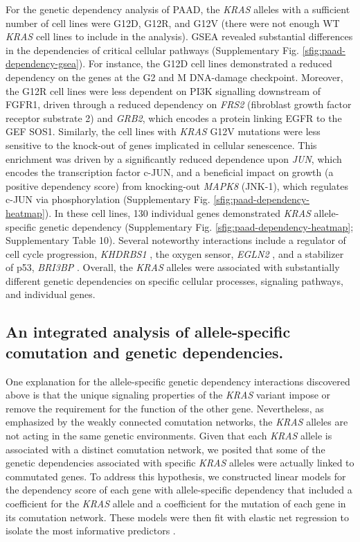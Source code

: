 \documentclass[english, 10pt, letterpaper]{article}
\newcommand{\KRAS}{\emph{KRAS}}
\begin{document}
For the genetic dependency analysis of PAAD, the \KRAS{} alleles with a sufficient number of cell lines were G12D, G12R, and G12V (there were not enough WT \KRAS{} cell lines to include in the analysis).
GSEA revealed substantial differences in the dependencies of critical cellular pathways (Supplementary Fig. \ref{sfig:paad-dependency-gsea}).
For instance, the G12D cell lines demonstrated a reduced dependency on the genes at the G2 and M DNA-damage checkpoint.
Moreover, the G12R cell lines were less dependent on PI3K signalling downstream of FGFR1, driven through a reduced dependency on \emph{FRS2} (fibroblast growth factor receptor substrate 2) and \emph{GRB2}, which encodes a protein linking EGFR to the GEF SOS1.
Similarly, the cell lines with \KRAS{} G12V mutations were less sensitive to the knock-out of genes implicated in cellular senescence.
This enrichment was driven by a significantly reduced dependence upon \emph{JUN}, which encodes the transcription factor c-JUN, and a beneficial impact on growth (a positive dependency score) from knocking-out \emph{MAPK8} (JNK-1), which regulates c-JUN via phosphorylation (Supplementary Fig. \ref{sfig:paad-dependency-heatmap}).
In these cell lines, 130 individual genes demonstrated \KRAS{} allele-specific genetic dependency (Supplementary Fig. \ref{sfig:paad-dependency-heatmap}; Supplementary Table 10).
Several noteworthy interactions include a regulator of cell cycle progression, \emph{KHDRBS1} \cite{Barlat1997ADomain}, the oxygen sensor, \emph{EGLN2} \cite{Ivan2017TheFeedbacks}, and a stabilizer of p53, \emph{BRI3BP} \cite{Ha2008HCCRBP-1Stabilization}.
Overall, the \KRAS{} alleles were associated with substantially different genetic dependencies on specific cellular processes, signaling pathways, and individual genes.


\subsection*{An integrated analysis of allele-specific comutation and genetic dependencies.}

One explanation for the allele-specific genetic dependency interactions discovered above is that the unique signaling properties of the \KRAS{} variant impose or remove the requirement for the function of the other gene. 
Nevertheless, as emphasized by the weakly connected comutation networks, the \KRAS{} alleles are not acting in the same genetic environments.
Given that each \KRAS{} allele is associated with a distinct comutation network, we posited that some of the genetic dependencies associated with specific \KRAS{} alleles were actually linked to commutated genes.
To address this hypothesis, we constructed linear models for the dependency score of each gene with allele-specific dependency that included a coefficient for the \KRAS{} allele and a coefficient for the mutation of each gene in its comutation network.
These models were then fit with elastic net regression to isolate the most informative predictors \cite{Zou2005RegularizationNet}.
\end{document}
